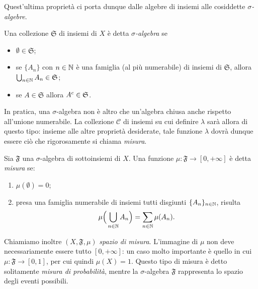 Quest'ultima proprietà ci porta dunque dalle algebre di insiemi alle cosiddette \emph{$\sigma$-algebre}.
\begin{definizione} \label{d:sigma-algebra}
	Una collezione $\mathfrak S$ di insiemi di $X$ è detta \emph{$\sigma$-algebra} se
	\begin{itemize}
		\item $\emptyset\in\mathfrak S$;
		\item se $\{A_n\}$ con $n\in\mathbb{N}$ è una famiglia (al più numerabile) di insiemi di $\mathfrak S$, allora $\bigcup_{n\in\mathbb{N}}A_n\in\mathfrak S$;
		\item se $A\in\mathfrak S$ allora ${A}^c\in\mathfrak S$.
	\end{itemize}
\end{definizione}
In pratica, una $\sigma$-algebra non è altro che un'algebra chiusa anche rispetto all'unione numerabile.
La collezione $\mathcal C$ di insiemi su cui definire $\lambda$ sarà allora di questo tipo: insieme alle altre proprietà desiderate, tale funzione $\lambda$ dovrà dunque essere ciò che rigorosamente si chiama \emph{misura}.
\begin{definizione} \label{d:misura}
	Sia $\mathfrak F$ una $\sigma$-algebra di sottoinsiemi di $X$.
	Una funzione $\mu\colon\mathfrak F\to[0,+\infty]$ è detta \emph{misura} se:
	\begin{enumerate}
		\item $\mu(\emptyset)=0$;
		\item presa una famiglia numerabile di insiemi tutti disgiunti $\{A_n\}_{n\in\mathbb{N}}$, risulta
			\begin{equation}
				\mu\Big(\bigcup_{n\in\mathbb{N}}A_n\Big)=\sum_{n\in\mathbb{N}}\mu(A_n).
				\label{eq:sigma-addivita}
			\end{equation}
	\end{enumerate}
\end{definizione}
Chiamiamo inoltre $(X,\mathfrak F,\mu)$ \emph{spazio di misura}.
L'immagine di $\mu$ non deve necessariamente essere tutto $[0,+\infty]$: un caso molto importante è quello in cui $\mu\colon\mathfrak F\to[0,1]$, per cui quindi $\mu(X)=1$.
Questo tipo di misura è detto solitamente \emph{misura di probabilità}, mentre la $\sigma$-algebra $\mathfrak F$ rappresenta lo spazio degli eventi possibili.

